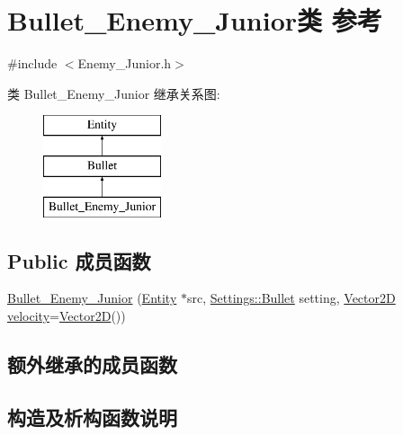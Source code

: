 \hypertarget{class_bullet___enemy___junior}{}\section{Bullet\+\_\+\+Enemy\+\_\+\+Junior类 参考}
\label{class_bullet___enemy___junior}


{\ttfamily \#include $<$Enemy\+\_\+\+Junior.\+h$>$}

类 Bullet\+\_\+\+Enemy\+\_\+\+Junior 继承关系图\+:\begin{figure}[H]
\begin{center}
\leavevmode
\includegraphics[height=3.000000cm]{class_bullet___enemy___junior}
\end{center}
\end{figure}
\subsection*{Public 成员函数}
\begin{DoxyCompactItemize}
\item 
\hyperlink{class_bullet___enemy___junior_a78eb487c660fab5536d868d7a61664eb}{Bullet\+\_\+\+Enemy\+\_\+\+Junior} (\hyperlink{class_entity}{Entity} $\ast$src, \hyperlink{struct_settings_1_1_bullet}{Settings\+::\+Bullet} setting, \hyperlink{_vector2_d_8hpp_aa1f1145650f1dd9bddf7335ec6434d7c}{Vector2D} \hyperlink{class_entity_a386d25b56772b8913eb3e5adc636f6e0}{velocity}=\hyperlink{_vector2_d_8hpp_aa1f1145650f1dd9bddf7335ec6434d7c}{Vector2D}())
\end{DoxyCompactItemize}
\subsection*{额外继承的成员函数}


\subsection{构造及析构函数说明}
\mbox{\label{class_bullet___enemy___junior_a78eb487c660fab5536d868d7a61664eb}} 
